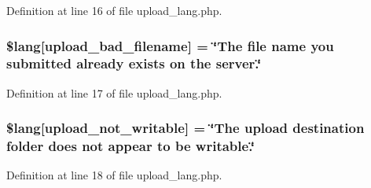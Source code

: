 Definition at line 16 of file upload\+\_\+lang.\+php.

\subsubsection[{\texorpdfstring{\$lang}{$lang}}]{\setlength{\rightskip}{0pt plus 5cm}\$lang\mbox{[}\textquotesingle{}upload\+\_\+bad\+\_\+filename\textquotesingle{}\mbox{]} = \char`\"{}The file {\bf name} you submitted already exists {\bf on} the server.\char`\"{}}\hypertarget{system_2language_2english_2upload__lang_8php_abb379322384f3f35952a539c63e2c8f7}{}\label{system_2language_2english_2upload__lang_8php_abb379322384f3f35952a539c63e2c8f7}


Definition at line 17 of file upload\+\_\+lang.\+php.

\subsubsection[{\texorpdfstring{\$lang}{$lang}}]{\setlength{\rightskip}{0pt plus 5cm}\$lang\mbox{[}\textquotesingle{}upload\+\_\+not\+\_\+writable\textquotesingle{}\mbox{]} = \char`\"{}The upload destination folder does not appear to be writable.\char`\"{}}\hypertarget{system_2language_2english_2upload__lang_8php_aed6bfb5a9094179427f61fcbb582145b}{}\label{system_2language_2english_2upload__lang_8php_aed6bfb5a9094179427f61fcbb582145b}


Definition at line 18 of file upload\+\_\+lang.\+php.

